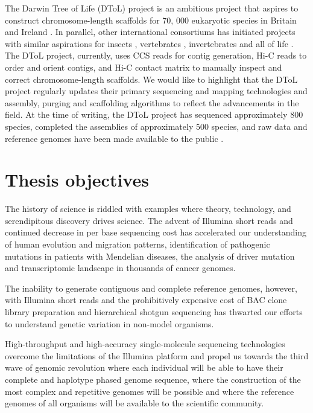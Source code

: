 The Darwin Tree of Life (DToL) project is an ambitious project that aspires to construct chromosome-length scaffolds for 70, 000 eukaryotic species in Britain and Ireland \cite{}. In parallel, other international consortiums has initiated projects with similar aspirations for insects \cite{}, vertebrates \cite{}, invertebrates \cite{} and all of life \cite{}. The DToL project, currently, uses CCS reads for contig generation, Hi-C reads to order and orient contigs, and Hi-C contact matrix to manually inspect and correct chromosome-length scaffolds. We would like to highlight that the DToL project regularly updates their primary sequencing and mapping technologies and assembly, purging and scaffolding algorithms to reflect the advancements in the field. At the time of writing, the DToL project has sequenced approximately 800 species, completed the assemblies of approximately 500 species, and raw data and reference genomes have been made available to the public \cite{}. 

\section{Thesis objectives}

The history of science is riddled with examples where theory, technology, and serendipitous discovery drives science. The advent of Illumina short reads and continued decrease in per base sequencing cost has accelerated our understanding of human evolution and migration patterns\cite{}, identification of pathogenic mutations in patients with Mendelian diseases\cite{}, the analysis of driver mutation and transcriptomic landscape in thousands of cancer genomes\cite{}. 

The inability to generate contiguous and complete reference genomes, however, with Illumina short reads\cite{} and the prohibitively expensive cost of BAC clone library preparation and hierarchical shotgun sequencing has thwarted our efforts to understand genetic variation in non-model organisms\cite{}.

High-throughput and high-accuracy single-molecule sequencing technologies\cite{Wenger2019-pw} overcome the limitations of the Illumina platform and propel us towards the third wave of genomic revolution where each individual will be able to have their complete and haplotype phased genome sequence, where the construction of the most complex and repetitive genomes will be possible and where the reference genomes of all organisms will be available to the scientific community. 


